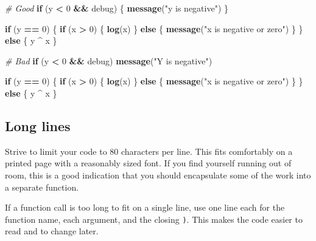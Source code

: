 \documentclass[]{book}
\newenvironment{Shaded}{\begin{snugshade}}{\end{snugshade}}
\newcommand{\CommentTok}[1]{\textcolor[rgb]{0.56,0.35,0.01}{\textit{#1}}}
\newcommand{\ControlFlowTok}[1]{\textcolor[rgb]{0.13,0.29,0.53}{\textbf{#1}}}
\newcommand{\DecValTok}[1]{\textcolor[rgb]{0.00,0.00,0.81}{#1}}
\newcommand{\KeywordTok}[1]{\textcolor[rgb]{0.13,0.29,0.53}{\textbf{#1}}}
\newcommand{\NormalTok}[1]{#1}
\newcommand{\OperatorTok}[1]{\textcolor[rgb]{0.81,0.36,0.00}{\textbf{#1}}}
\newcommand{\StringTok}[1]{\textcolor[rgb]{0.31,0.60,0.02}{#1}}
\theoremstyle{definition}
\theoremstyle{definition}
\theoremstyle{definition}
\theoremstyle{remark}
\begin{document}
\begin{Shaded}
\begin{Highlighting}[]
\CommentTok{# Good}
\ControlFlowTok{if}\NormalTok{ (y }\OperatorTok{<}\StringTok{ }\DecValTok{0} \OperatorTok{&&}\StringTok{ }\NormalTok{debug) \{}
  \KeywordTok{message}\NormalTok{(}\StringTok{"y is negative"}\NormalTok{)}
\NormalTok{\}}

\ControlFlowTok{if}\NormalTok{ (y }\OperatorTok{==}\StringTok{ }\DecValTok{0}\NormalTok{) \{}
  \ControlFlowTok{if}\NormalTok{ (x }\OperatorTok{>}\StringTok{ }\DecValTok{0}\NormalTok{) \{}
    \KeywordTok{log}\NormalTok{(x)}
\NormalTok{  \} }\ControlFlowTok{else}\NormalTok{ \{}
    \KeywordTok{message}\NormalTok{(}\StringTok{"x is negative or zero"}\NormalTok{)}
\NormalTok{  \}}
\NormalTok{\} }\ControlFlowTok{else}\NormalTok{ \{}
\NormalTok{  y }\OperatorTok{^}\StringTok{ }\NormalTok{x}
\NormalTok{\}}

\CommentTok{# Bad}
\ControlFlowTok{if}\NormalTok{ (y }\OperatorTok{<}\StringTok{ }\DecValTok{0} \OperatorTok{&&}\StringTok{ }\NormalTok{debug)}
\KeywordTok{message}\NormalTok{(}\StringTok{"Y is negative"}\NormalTok{)}

\ControlFlowTok{if}\NormalTok{ (y }\OperatorTok{==}\StringTok{ }\DecValTok{0}\NormalTok{)}
\NormalTok{\{}
    \ControlFlowTok{if}\NormalTok{ (x }\OperatorTok{>}\StringTok{ }\DecValTok{0}\NormalTok{) \{}
      \KeywordTok{log}\NormalTok{(x)}
\NormalTok{    \} }\ControlFlowTok{else}\NormalTok{ \{}
  \KeywordTok{message}\NormalTok{(}\StringTok{"x is negative or zero"}\NormalTok{)}
\NormalTok{    \}}
\NormalTok{\} }\ControlFlowTok{else}\NormalTok{ \{ y }\OperatorTok{^}\StringTok{ }\NormalTok{x \}}
\end{Highlighting}
\end{Shaded}

\hypertarget{long-lines}{%
\subsection{Long lines}\label{long-lines}}

Strive to limit your code to 80 characters per line. This fits
comfortably on a printed page with a reasonably sized font. If you find
yourself running out of room, this is a good indication that you should
encapsulate some of the work into a separate function.

If a function call is too long to fit on a single line, use one line
each for the function name, each argument, and the closing \texttt{)}.
This makes the code easier to read and to change later.
\end{document}
